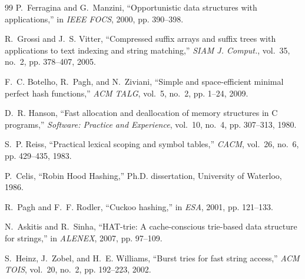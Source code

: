 \documentclass[conference]{IEEEtran}
\begin{document}
\begin{thebibliography}{99}
P.~Ferragina and G.~Manzini, ``Opportunistic data structures with applications,'' in \emph{IEEE FOCS}, 2000, pp. 390--398.

R.~Grossi and J.~S. Vitter, ``Compressed suffix arrays and suffix trees with applications to text indexing and string matching,'' \emph{SIAM J. Comput.}, vol.~35, no.~2, pp. 378--407, 2005.

F.~C. Botelho, R.~Pagh, and N.~Ziviani, ``Simple and space-efficient minimal perfect hash functions,'' \emph{ACM TALG}, vol.~5, no.~2, pp. 1--24, 2009.

D.~R. Hanson, ``Fast allocation and deallocation of memory structures in C programs,'' \emph{Software: Practice and Experience}, vol.~10, no.~4, pp. 307--313, 1980.

S.~P. Reiss, ``Practical lexical scoping and symbol tables,'' \emph{CACM}, vol.~26, no.~6, pp. 429--435, 1983.

P.~Celis, ``Robin Hood Hashing,'' Ph.D. dissertation, University of Waterloo, 1986.

R.~Pagh and F.~F. Rodler, ``Cuckoo hashing,'' in \emph{ESA}, 2001, pp. 121--133.

N.~Askitis and R.~Sinha, ``HAT-trie: A cache-conscious trie-based data structure for strings,'' in \emph{ALENEX}, 2007, pp. 97--109.

S.~Heinz, J.~Zobel, and H.~E. Williams, ``Burst tries for fast string access,'' \emph{ACM TOIS}, vol.~20, no.~2, pp. 192--223, 2002.

\end{thebibliography}
\end{document}
